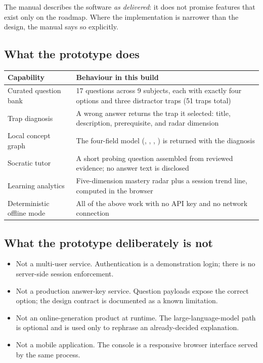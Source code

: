 \documentclass[11pt,a4paper]{article}
\newcommand{\code}[1]{\texttt{\small\detokenize{#1}}}
\begin{document}
The manual describes the software \emph{as delivered}: it does not promise features that exist only on the roadmap.
Where the implementation is narrower than the design, the manual says so explicitly.

\subsection{What the prototype does}

\begin{tabularx}{\textwidth}{@{}lX@{}}
\toprule
\textbf{Capability} & \textbf{Behaviour in this build} \\
\midrule
Curated question bank & 17 questions across 9 subjects, each with exactly four options and three distractor traps (51 traps total) \\
Trap diagnosis & A wrong answer returns the trap it selected: title, description, prerequisite, and radar dimension \\
Local concept graph & The four-field model (\code{GraphData}, \code{GraphNode}, \code{GraphEdge}, \code{TrapDetail}) is returned with the diagnosis \\
Socratic tutor & A short probing question assembled from reviewed evidence; no answer text is disclosed \\
Learning analytics & Five-dimension mastery radar plus a session trend line, computed in the browser \\
Deterministic offline mode & All of the above work with no API key and no network connection \\
\bottomrule
\end{tabularx}

\subsection{What the prototype deliberately is not}

\begin{itemize}[leftmargin=1.4em,itemsep=0.15em]
  \item Not a multi-user service. Authentication is a demonstration login; there is no server-side session enforcement.
  \item Not a production answer-key service. Question payloads expose the correct option; the design contract is documented as a known limitation.
  \item Not an online-generation product at runtime. The large-language-model path is optional and is used only to rephrase an already-decided explanation.
  \item Not a mobile application. The console is a responsive browser interface served by the same process.
\end{itemize}
\end{document}
